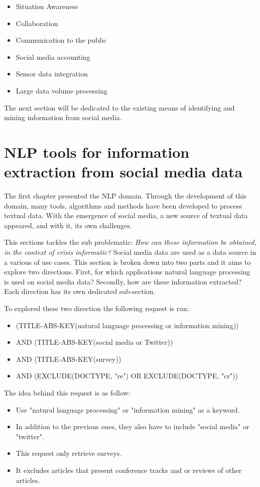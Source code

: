 \begin{itemize}
    \item Situation Awareness
    \item Collaboration
    \item Communication to the public
    \item Social media accounting
    \item Sensor data integration
    \item Large data volume processing
\end{itemize}

The next section will be dedicated to the existing means of identifying and mining information from social media.

\section{NLP tools for information extraction from social media data}
The first chapter presented the NLP domain.
Through the development of this domain, many tools, algorithms and methods have been developed to process textual data.
With the emergence of social media, a new source of textual data appeared, and with it, its own challenges.

This sections tackles the sub problematic: \emph{How can these information be obtained, in the context of crisis informatic?}
Social media data are used as a data source in a various of use cases.
This section is broken down into two parts and it aims to explore two directions.
First, for which applications natural language processing is used on social media data?
Secondly, how are these information extracted?
Each direction has its own dedicated sub-section.

To explored these two direction the following request is run:

\begin{itemize}
    \item (TITLE-ABS-KEY({natural language processing} or {information mining}))
    \item AND (TITLE-ABS-KEY({social media} or Twitter))
    \item AND (TITLE-ABS-KEY(survey))
    \item AND (EXCLUDE(DOCTYPE, "re") OR EXCLUDE(DOCTYPE, "cr"))
\end{itemize}

The idea behind this request is as follow:

\begin{itemize}
    \item Use "natural language processing" or "information mining" as a keyword.
    \item In addition to the previous ones, they also have to include "social media" or "twitter".
    \item This request only retrieve surveys.
    \item It excludes articles that present conference tracks and or reviews of other articles.
\end{itemize}

